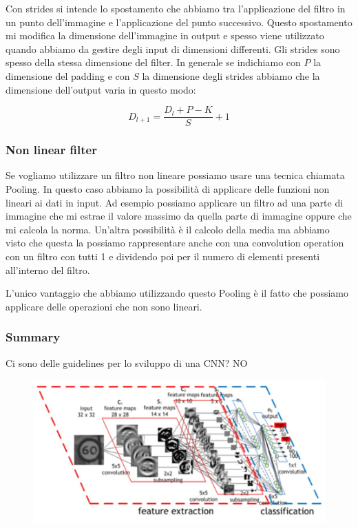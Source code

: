 \documentclass[14pt]{extreport}
\begin{document}
Con strides si intende lo spostamento che abbiamo tra l'applicazione del filtro in un punto dell'immagine e l'applicazione del punto successivo.
Questo spostamento mi modifica la dimensione dell'immagine in output e spesso viene utilizzato quando abbiamo da gestire degli input di dimensioni
differenti. Gli strides sono spesso della stessa dimensione del filter. In generale se indichiamo con $P$ la dimensione del padding e con $S$ la
dimensione degli strides abbiamo che la dimensione dell'output varia in questo modo:

$$D_{l+1} = \frac{D_l+P-K}{S} + 1$$

\subsubsection{Non linear filter}

Se vogliamo utilizzare un filtro non lineare possiamo usare una tecnica chiamata Pooling. In questo caso abbiamo la possibilità di applicare delle
funzioni non lineari ai dati in input. Ad esempio possiamo applicare un filtro ad una parte di immagine che mi estrae il valore massimo da quella
parte di immagine oppure che mi calcola la norma. Un'altra possibilità è il calcolo della media ma abbiamo visto che questa la possiamo rappresentare
anche con una convolution operation con un filtro con tutti 1 e dividendo poi per il numero di elementi presenti all'interno del filtro.

L'unico vantaggio che abbiamo utilizzando questo Pooling è il fatto che possiamo applicare delle operazioni che non sono lineari.

\subsubsection{Summary}

Ci sono delle guidelines per lo sviluppo di una CNN? NO

\begin{figure}[H]
\centering
\includegraphics[width=0.7\linewidth]{407.jpeg}
\end{figure}
\end{document}
